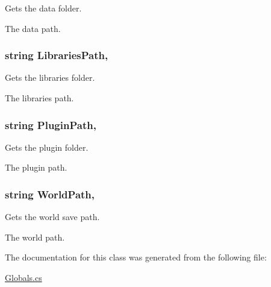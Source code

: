 Gets the data folder. 

The data path.\hypertarget{classOTA_1_1Globals_a8a44939c13246f2f6bb236bb07e782da}{}
\subsubsection[{Libraries\+Path}]{\setlength{\rightskip}{0pt plus 5cm}string Libraries\+Path\hspace{0.3cm}{\ttfamily [static]}, {\ttfamily [get]}}\label{classOTA_1_1Globals_a8a44939c13246f2f6bb236bb07e782da}


Gets the libraries folder. 

The libraries path.\hypertarget{classOTA_1_1Globals_af63247199be40f4f0d91a2a1fe6cc763}{}
\subsubsection[{Plugin\+Path}]{\setlength{\rightskip}{0pt plus 5cm}string Plugin\+Path\hspace{0.3cm}{\ttfamily [static]}, {\ttfamily [get]}}\label{classOTA_1_1Globals_af63247199be40f4f0d91a2a1fe6cc763}


Gets the plugin folder. 

The plugin path.\hypertarget{classOTA_1_1Globals_abb9120b8f19913bede3e1f7710eb7059}{}
\subsubsection[{World\+Path}]{\setlength{\rightskip}{0pt plus 5cm}string World\+Path\hspace{0.3cm}{\ttfamily [static]}, {\ttfamily [get]}}\label{classOTA_1_1Globals_abb9120b8f19913bede3e1f7710eb7059}


Gets the world save path. 

The world path.

The documentation for this class was generated from the following file\+:\begin{DoxyCompactItemize}
\item 
\hyperlink{Globals_8cs}{Globals.\+cs}\end{DoxyCompactItemize}
